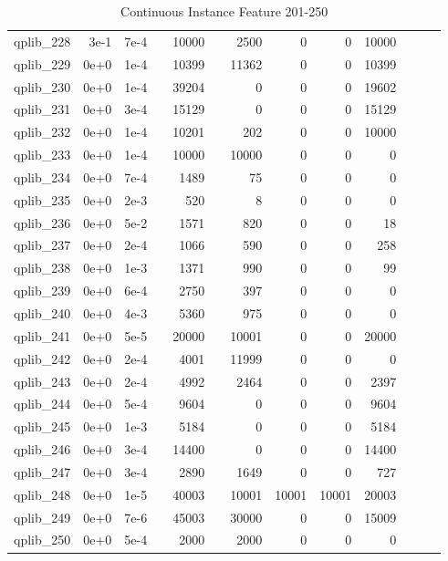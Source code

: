 \begin{table}
\begin{tabular}{lrrrrrrrrrrrr}
qplib\_228	&	3e-1	&	7e-4	&	&	10000	&	&	2500	&	0	&	0	&	10000	\\
qplib\_229	&	0e+0	&	1e-4	&	&	10399	&	&	11362	&	0	&	0	&	10399	\\
qplib\_230	&	0e+0	&	1e-4	&	&	39204	&	&	0	&	0	&	0	&	19602	\\
qplib\_231	&	0e+0	&	3e-4	&	&	15129	&	&	0	&	0	&	0	&	15129	\\
qplib\_232	&	0e+0	&	1e-4	&	&	10201	&	&	202	&	0	&	0	&	10000	\\
qplib\_233	&	0e+0	&	1e-4	&	&	10000	&	&	10000	&	0	&	0	&	0	\\
qplib\_234	&	0e+0	&	7e-4	&	&	1489	&	&	75	&	0	&	0	&	0	\\
qplib\_235	&	0e+0	&	2e-3	&	&	520	&	&	8	&	0	&	0	&	0	\\
qplib\_236	&	0e+0	&	5e-2	&	&	1571	&	&	820	&	0	&	0	&	18	\\
qplib\_237	&	0e+0	&	2e-4	&	&	1066	&	&	590	&	0	&	0	&	258	\\
qplib\_238	&	0e+0	&	1e-3	&	&	1371	&	&	990	&	0	&	0	&	99	\\
qplib\_239	&	0e+0	&	6e-4	&	&	2750	&	&	397	&	0	&	0	&	0	\\
qplib\_240	&	0e+0	&	4e-3	&	&	5360	&	&	975	&	0	&	0	&	0	\\
qplib\_241	&	0e+0	&	5e-5	&	&	20000	&	&	10001	&	0	&	0	&	20000	\\
qplib\_242	&	0e+0	&	2e-4	&	&	4001	&	&	11999	&	0	&	0	&	0	\\
qplib\_243	&	0e+0	&	2e-4	&	&	4992	&	&	2464	&	0	&	0	&	2397	\\
qplib\_244	&	0e+0	&	5e-4	&	&	9604	&	&	0	&	0	&	0	&	9604	\\
qplib\_245	&	0e+0	&	1e-3	&	&	5184	&	&	0	&	0	&	0	&	5184	\\
qplib\_246	&	0e+0	&	3e-4	&	&	14400	&	&	0	&	0	&	0	&	14400	\\
qplib\_247	&	0e+0	&	3e-4	&	&	2890	&	&	1649	&	0	&	0	&	727	\\
qplib\_248	&	0e+0	&	1e-5	&	&	40003	&	&	10001	&	10001	&	10001	&	20003	\\
qplib\_249	&	0e+0	&	7e-6	&	&	45003	&	&	30000	&	0	&	0	&	15009	\\
qplib\_250	&	0e+0	&	5e-4	&	&	2000	&	&	2000	&	0	&	0	&	0	\\

														


\bottomrule

\end{tabular}  
\label{tab:B5}
\caption{Continuous  Instance Feature 201-250} 

\end{table}


